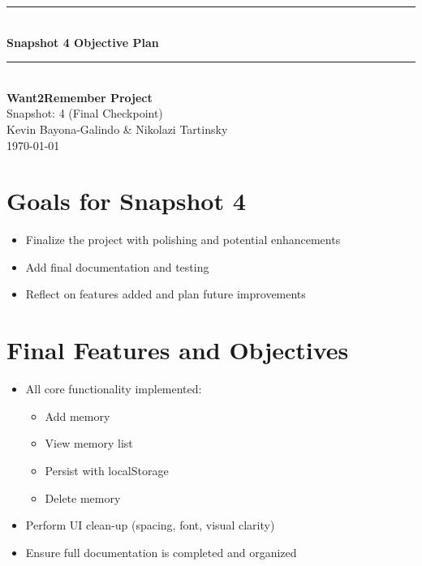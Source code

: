 \documentclass[12pt]{article}
\begin{document}
\begin{titlepage}
    \newcommand{\HRule}{\rule{\linewidth}{0.5mm}} 
    \vspace*{\fill}
    \begin{center}
        \HRule \\[0.5cm]
        {\Huge \bfseries Snapshot 4 Objective Plan \\[0.4cm]}
        \HRule \\[1.5cm]
        {\LARGE \textbf{Want2Remember Project}}\\[0.5cm]
        {\Large Snapshot: 4 (Final Checkpoint)}\\[2cm]
        {\Large Kevin Bayona-Galindo \& Nikolazi Tartinsky}\\[0.5cm]
        {\large \today}
    \end{center}
    \vspace*{\fill}
\end{titlepage}

\section*{Goals for Snapshot 4}
\begin{itemize}
  \item Finalize the project with polishing and potential enhancements
  \item Add final documentation and testing
  \item Reflect on features added and plan future improvements
\end{itemize}

\section*{Final Features and Objectives}
\begin{itemize}
  \item All core functionality implemented:
  \begin{itemize}
    \item Add memory
    \item View memory list
    \item Persist with localStorage
    \item Delete memory
  \end{itemize}
  \item Perform UI clean-up (spacing, font, visual clarity)
  \item Ensure full documentation is completed and organized
\end{itemize}
\end{document}
